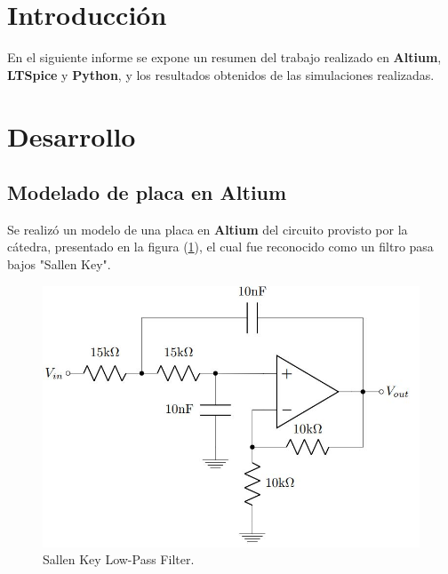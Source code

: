\documentclass[a4paper]{article}
\begin{document}




\section*{Introducción}

En el siguiente informe se expone un resumen del trabajo realizado en \textbf{Altium}, \textbf{LTSpice} y \textbf{Python}, y los resultados obtenidos de las simulaciones realizadas.

\section*{Desarrollo}

\subsection*{Modelado de placa en Altium}
Se realizó un modelo de una placa en \textbf{Altium} del circuito provisto por la cátedra, presentado en la figura (\ref{fig:AltiumCirc}), el cual fue reconocido como un filtro pasa bajos "Sallen Key".


\begin{figure}[H]
	\centering
	\includegraphics[width=\textwidth]{Altium-Circuito}
	\caption{Sallen Key Low-Pass Filter.}
	\label{fig:AltiumCirc}
\end{figure}
\end{document}
